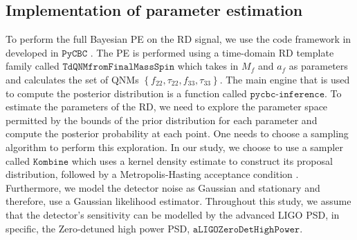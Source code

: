 \subsection{Implementation of parameter estimation}
\label{sec:PE-details}
To perform the full Bayesian PE on the RD signal, we use the code framework in developed in $\texttt{PyCBC}$ . The PE is performed using a time-domain RD template family called $\texttt{TdQNMfromFinalMassSpin}$ which takes in $M_{f}$ and $a_{f}$ as parameters and calculates the set of QNMs $\left\lbrace f_{22}, \tau_{22}, f_{33}, \tau_{33} \right\rbrace$.  The main engine that is used to compute the posterior distribution is a function called $\texttt{pycbc-inference}$. To estimate the parameters of the RD, we need to explore the parameter space permitted by the bounds of the prior distribution for each parameter and compute the posterior probability at each point. One needs to choose a sampling algorithm to perform this exploration. In our study, we choose to use a sampler called $\texttt{Kombine}$ which uses a kernel density estimate to construct its proposal distribution, followed by a Metropolis-Hasting acceptance condition \cite{10.2307/2684568}. Furthermore, we model the detector noise as Gaussian and stationary and therefore, use a Gaussian likelihood estimator. Throughout this study, we assume that the detector's sensitivity can be modelled by the advanced LIGO PSD, in specific, the Zero-detuned high power PSD, $\texttt{aLIGOZeroDetHighPower}$.


